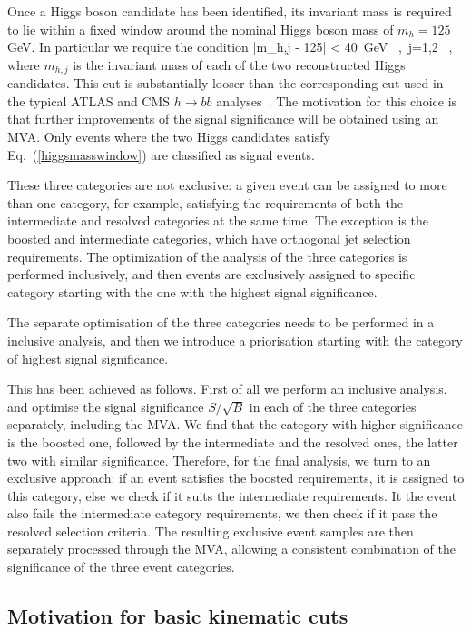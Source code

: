 Once a Higgs boson candidate has been identified,
its invariant mass is required to lie within a fixed window
around the nominal Higgs boson mass of $m_h= 125$
GeV.
%
In particular we require the condition
\be
\label{higgsmasswindow}
|m_{h,j} - 125| < 40~{\rm GeV} \, ,\, j=1,2 \, ,
\ee
where $m_{h,j}$ is the invariant mass of each of the two reconstructed  Higgs candidates.
%
This cut is substantially looser than the corresponding
cut used in the typical ATLAS and CMS $h\to b\bar{b}$
analyses~\cite{Aad:2012gxa,Chatrchyan:2013zna}.
%
The motivation
for this choice 
is that further improvements of the
signal significance will be obtained using an MVA.
%
Only events where the two Higgs candidates satisfy
Eq.~(\ref{higgsmasswindow}) are classified as signal events.
%

These three categories are not exclusive:
a given event can be assigned to more than one category, for
example, satisfying the requirements of both the intermediate
and resolved
categories at the same time.
%
The exception is the boosted and intermediate categories, which have
orthogonal jet selection requirements.
%
The optimization of the analysis
of the three categories is performed inclusively, and
then events are exclusively assigned to specific category
starting with the one with the highest signal significance.


The separate optimisation of the three categories needs to be performed in
a inclusive analysis, and then we introduce a
 priorisation starting with the category of highest signal significance.


 This has been achieved as follows.
First of all we perform an inclusive analysis, and optimise the
signal significance
$S/\sqrt{B}$ in each of the three categories separately, including
the MVA.
%
We find that the category with higher significance is
the boosted one,
followed by the intermediate and the resolved ones, the latter two
with similar significance.
%
Therefore, for the final analysis, we turn to an exclusive approach:
if an event satisfies the boosted requirements, it is assigned to
this category, else we check if it suits the intermediate
requirements.
%
It the event also fails the intermediate category
requirements, we
then check if it pass the resolved selection criteria.
%
The resulting exclusive event samples are then separately processed
through the MVA, allowing a consistent combination
of the significance of the three event categories.

\subsection{Motivation for basic kinematic cuts}

